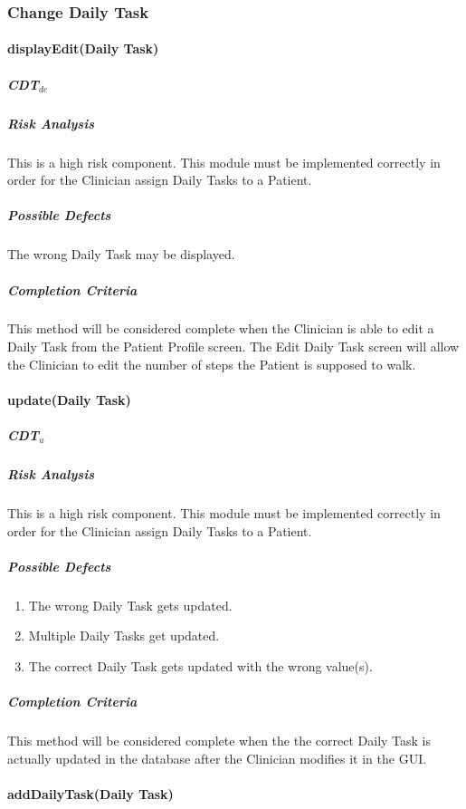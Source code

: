 \documentclass{article}
\begin{document}
\subsubsection{Change Daily Task}

\paragraph{displayEdit(Daily Task)}

\subparagraph{CDT$_{de}$}

\subparagraph{Risk Analysis}
This is a high risk component. This module must be implemented correctly in order for the Clinician assign Daily Tasks to a Patient.

\subparagraph{Possible Defects}
The wrong Daily Task may be displayed.


\subparagraph{Completion Criteria}
This method will be considered complete when the Clinician is able to edit a Daily Task from the Patient Profile screen. The Edit Daily Task screen will allow 
the Clinician to edit the number of steps the Patient is supposed to walk. 

\paragraph{update(Daily Task)}

\subparagraph{CDT$_{u}$}

\subparagraph{Risk Analysis}
This is a high risk component. This module must be implemented correctly in order for the Clinician assign Daily Tasks to a Patient.

\subparagraph{Possible Defects}
\begin{enumerate}
\item The wrong Daily Task gets updated.
\item Multiple Daily Tasks get updated. 
\item The correct Daily Task gets updated with the wrong value(s). 
\end{enumerate}

\subparagraph{Completion Criteria}
This method will be considered complete when the the correct Daily Task is actually updated in the database after the Clinician modifies it in the GUI.

\paragraph{addDailyTask(Daily Task)}
\end{document}
